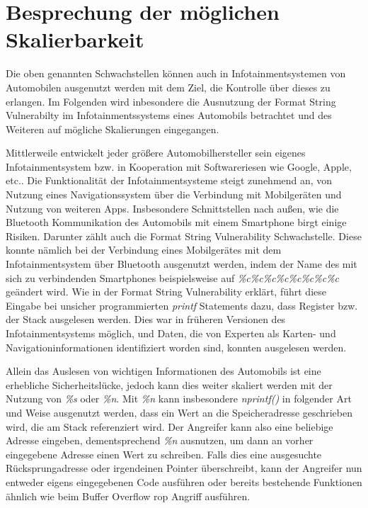 \documentclass[a4paper,
DIV=13,
12pt,
BCOR=10mm,
department=FakIM,
oneside,
parskip=half,
automark,
listof=totocnumbered,
bibliography=totocnumbered,
acronym=totocnumbered
] {OTHRartcl}
\begin{document}
\section{Besprechung der möglichen Skalierbarkeit}
Die oben genannten Schwachstellen können auch in Infotainmentsystemen von Automobilen ausgenutzt werden mit dem Ziel, die Kontrolle über dieses zu erlangen.
Im Folgenden wird inbesondere die Ausnutzung der Format String Vulnerabilty im Infotainmentssystems eines Automobils betrachtet und des Weiteren auf mögliche Skalierungen eingegangen.

Mittlerweile entwickelt jeder größere Automobilhersteller sein eigenes Infotainmentsystem bzw. in Kooperation mit Softwareriesen wie Google, Apple, etc..
Die Funktionalität der Infotainmentsysteme steigt zunehmend an, von Nutzung eines Navigationssystem über die Verbindung mit Mobilgeräten und Nutzung von weiteren Apps.
Insbesondere Schnittstellen nach außen, wie die Bluetooth Kommunikation des Automobils mit einem Smartphone birgt einige Risiken.
Darunter zählt auch die Format String Vulnerability Schwachstelle. Diese konnte nämlich bei der Verbindung eines Mobilgerätes mit dem Infotainmentsystem über Bluetooth
ausgenutzt werden, indem der Name des mit sich zu verbindenden Smartphones beispielsweise auf \textit{\%c\%c\%c\%c\%c\%c\%c\%c} geändert wird.
Wie in der Format String Vulnerability erklärt, führt diese Eingabe bei unsicher programmierten \textit{printf} Statements dazu, dass Register bzw. der Stack ausgelesen werden.
Dies war in früheren Versionen des Infotainmentsystems möglich, und Daten, die von Experten als Karten- und Navigationinformationen identifiziert worden sind, konnten ausgelesen werden.

Allein das Auslesen von wichtigen Informationen des Automobils ist eine erhebliche Sicherheitslücke, jedoch kann dies weiter skaliert werden mit der Nutzung von \textit{\%s} oder \textit{\%n}.
Mit \textit{\%n} kann insbesondere \textit{nprintf()} in folgender Art und Weise ausgenutzt werden, dass ein Wert an die Speicheradresse geschrieben wird, die am Stack referenziert wird.
Der Angreifer kann also eine beliebige Adresse eingeben, dementsprechend \textit{\%n} ausnutzen, um dann an vorher eingegebene Adresse einen Wert zu schreiben.
Falls dies eine ausgesuchte Rücksprungadresse oder irgendeinen Pointer überschreibt, kann der Angreifer nun entweder eigens eingegebenen Code ausführen oder bereits bestehende Funktionen
ähnlich wie beim Buffer Overflow \ac{rop} Angriff ausführen.
\end{document}
